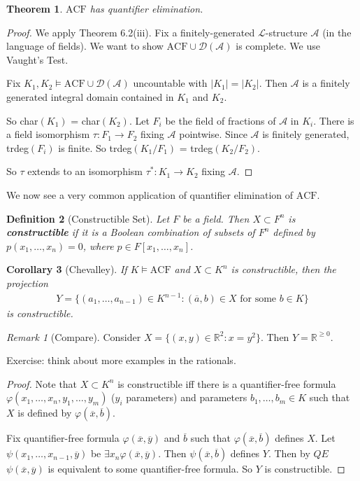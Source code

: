 \documentclass[]{article}
\theoremstyle{custhm}
\newtheorem{theorem}{Theorem}[section]
\theoremstyle{cusdef}
\newtheorem{defin}[theorem]{Definition}
\theoremstyle{custhm}
\theoremstyle{custhm}
\newtheorem{cor}[theorem]{Corollary}
\theoremstyle{custhm}
\theoremstyle{ex}
\theoremstyle{custhm}
\theoremstyle{cusdef}
\theoremstyle{remark}
\newtheorem*{remark*}{Remark}
\newcommand{\R}{\mathbb{R}}
\newcommand{\ra}{\rightarrow}
\newcommand{\undf}[1]{\textit{\textbf{#1}}}
\renewcommand{\L}{\mathcal{L}}
\renewcommand{\phi}{\varphi}
\renewcommand{\bar}{\overline}
\newcommand{\acf}{\textrm{ACF}}
\newcommand{\A}{\mathcal{A}}
\newcommand{\D}{\mathcal{D}}
\begin{document}
\begin{theorem}
$\acf$ has quantifier elimination.
\end{theorem}
\begin{proof}
We apply Theorem 6.2(iii). Fix a finitely-generated $\L$-structure $\A$ (in the language of fields). We want to show $\acf\cup \D(\A)$ is complete. We use Vaught's Test.

Fix $K_1,K_2\models\acf\cup \D(\A)$ uncountable with $|K_1| = |K_2|$. Then $\A$ is a finitely generated integral domain contained in $K_1$ and $K_2$.

So char$(K_1)$ = char\((K_2)\). Let $F_i$ be the field of fractions of $\A$ in $K_i$. There is a field isomorphism $\tau : F_1\ra F_2$ fixing $\A$ pointwise. Since $\A$ is finitely generated, trdeg$(F_i)$ is finite. So trdeg$(K_1/F_1)$ = trdeg$(K_2/F_2)$.

So $\tau$ extends to an isomorphism $\tau^\ast: K_1\ra K_2$ fixing $\A$.
\end{proof}
We now see a very common application of quantifier elimination of $\acf$.

\begin{defin}[Constructible Set]
Let $F$ be a field. Then $X\subset F^n$ is \undf{constructible} if it is a Boolean combination of subsets of $F^n$ defined by $p(x_1,\dots,x_n) = 0$, where $p \in F[x_1,\dots,x_n]$.
\end{defin}
\begin{cor}[Chevalley]
If $K\models \acf$ and $X\subset K^n$ is constructible, then the projection
\begin{align*}
Y = \{(a_1,\dots,a_{n-1})\in K^{n-1}:(\overline{a},b)\in X\textrm{ for some }b\in K\}
\end{align*}
is constructible.
\end{cor}

\begin{remark*}[Compare]
Consider $X = \{(x,y)\in \R^2:x = y^2\}$. Then $Y = \R^{\ge 0}$.

Exercise: think about more examples in the rationals.
\end{remark*}
\begin{proof}
Note that $X\subset K^n$ is constructible iff there is a quantifier-free formula $\phi(x_1,\dots,x_n,y_1,\dots,y_m)$ ($y_i$ parameters) and parameters $b_1,\dots,b_m\in K$ such that $X$ is defined by $\phi(\bar{x},\bar{b})$.

Fix quantifier-free formula $\phi(\bar{x},\bar{y})$ and $\bar{b}$ such that $\phi(\bar{x},\bar{b})$ defines $X$. Let $\psi(x_1,\dots,x_{n-1},\bar{y})$ be $\exists x_n\phi(\bar{x},\bar{y})$. Then $\psi(\bar{x},\bar{b})$ defines $Y$. Then by $QE$ $\psi(\bar{x},\bar{y})$ is equivalent to some quantifier-free formula. So $Y$ is constructible.
\end{proof}
\end{document}
